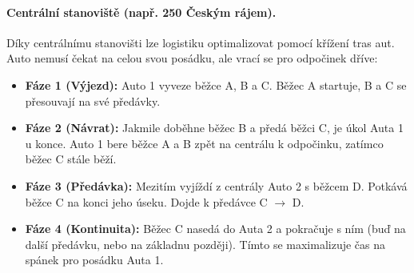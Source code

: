 \documentclass[10pt, a4paper]{article}
\begin{document}
	
	\paragraph{Centrální stanoviště (např. 250 Českým rájem).}
	Díky centrálnímu stanovišti lze logistiku optimalizovat pomocí křížení tras aut. Auto nemusí čekat na celou svou posádku, ale vrací se pro odpočinek dříve:
	\begin{itemize}
		\item \textbf{Fáze 1 (Výjezd):} Auto 1 vyveze běžce A, B a C. Běžec A startuje, B a C se přesouvají na své předávky.
		\item \textbf{Fáze 2 (Návrat):} Jakmile doběhne běžec B a předá běžci C, je úkol Auta 1 u konce. Auto 1 bere běžce A a B zpět na centrálu k odpočinku, zatímco běžec C stále běží.
		\item \textbf{Fáze 3 (Předávka):} Mezitím vyjíždí z centrály Auto 2 s běžcem D. Potkává běžce C na konci jeho úseku. Dojde k předávce C $\rightarrow$ D.
		\item \textbf{Fáze 4 (Kontinuita):} Běžec C nasedá do Auta 2 a pokračuje s ním (buď na další předávku, nebo na základnu později). Tímto se maximalizuje čas na spánek pro posádku Auta 1.
	\end{itemize}
	
\end{document}
